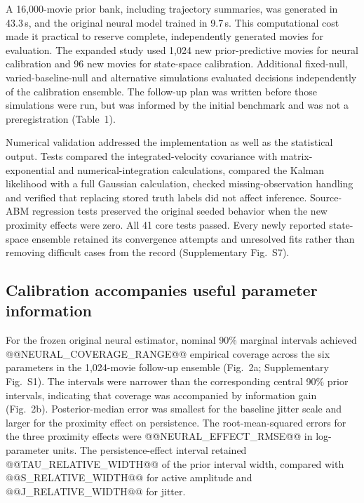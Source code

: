 \documentclass[12pt]{article}
\begin{document}
A 16,000-movie prior bank, including trajectory summaries, was generated in 43.3\,s, and the original neural model trained in 9.7\,s. This computational cost made it practical to reserve complete, independently generated movies for evaluation. The expanded study used 1,024 new prior-predictive movies for neural calibration and 96 new movies for state-space calibration. Additional fixed-null, varied-baseline-null and alternative simulations evaluated decisions independently of the calibration ensemble. The follow-up plan was written before those simulations were run, but was informed by the initial benchmark and was not a preregistration (Table~1).

Numerical validation addressed the implementation as well as the statistical output. Tests compared the integrated-velocity covariance with matrix-exponential and numerical-integration calculations, compared the Kalman likelihood with a full Gaussian calculation, checked missing-observation handling and verified that replacing stored truth labels did not affect inference. Source-ABM regression tests preserved the original seeded behavior when the new proximity effects were zero. All 41 core tests passed. Every newly reported state-space ensemble retained its convergence attempts and unresolved fits rather than removing difficult cases from the record (Supplementary Fig.~S7).

\subsection*{Calibration accompanies useful parameter information}
For the frozen original neural estimator, nominal 90\% marginal intervals achieved @@NEURAL_COVERAGE_RANGE@@ empirical coverage across the six parameters in the 1,024-movie follow-up ensemble (Fig.~2a; Supplementary Fig.~S1). The intervals were narrower than the corresponding central 90\% prior intervals, indicating that coverage was accompanied by information gain (Fig.~2b). Posterior-median error was smallest for the baseline jitter scale and larger for the proximity effect on persistence. The root-mean-squared errors for the three proximity effects were @@NEURAL_EFFECT_RMSE@@ in log-parameter units. The persistence-effect interval retained @@TAU_RELATIVE_WIDTH@@ of the prior interval width, compared with @@S_RELATIVE_WIDTH@@ for active amplitude and @@J_RELATIVE_WIDTH@@ for jitter.
\end{document}
